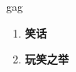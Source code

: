 
\begin{frame}
{\huge gag}
\begin{center}
\begin{enumerate}\Large
  \item \textbf{笑话}
  \item \textbf{玩笑之举}
\end{enumerate}
\end{center}
\end{frame}
